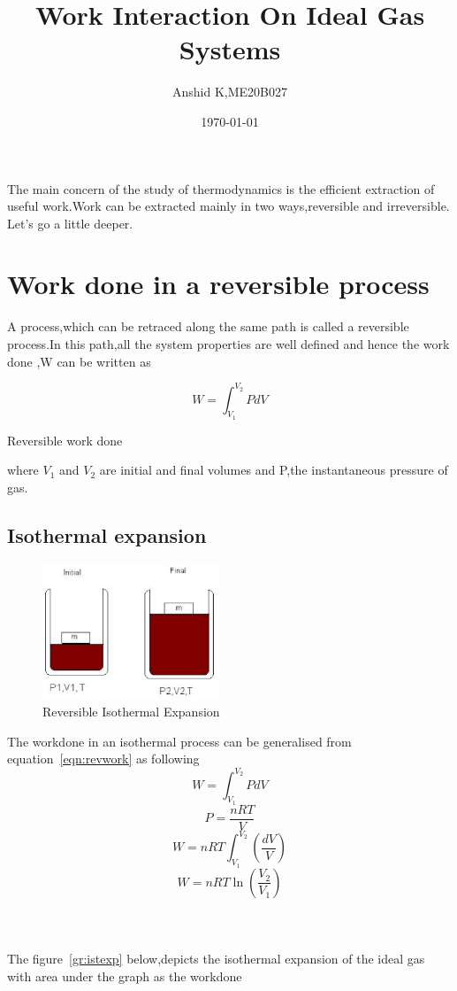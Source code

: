 \documentclass[a4paper,12pt]{article}
\begin{document}
\title{Work Interaction On Ideal Gas Systems}
\author{Anshid K,ME20B027}
\date{\today}
\maketitle

The main concern of the study of thermodynamics is the efficient extraction of useful work.Work can be extracted mainly in two ways,reversible and irreversible.
Let's go a little deeper.
 
\section{Work done in a reversible process}

A process,which can be retraced along the same path is called a reversible process.In this path,all the system properties are well defined and hence the work done ,W can be written as

\begin{equation}
	W=\int_{V_1}^{V_2}{PdV}
	\label{eqn:revwork}
\end{equation}
\begin{center}
Reversible work done ~\cite{fleming_me027}
\end{center}
where $V_1$ and $V_2$ are initial and final volumes and P,the instantaneous pressure of gas.

\subsection{Isothermal expansion}
\begin{figure}[h]
	\begin{center}
		\includegraphics[width=200px]{me20b027a.eps}
	\end{center}
	\caption{Reversible Isothermal Expansion~\cite{libtex_me027}}
	\label{fig:revexp}
\end{figure}
The workdone in an isothermal process can be generalised from equation~\ref{eqn:revwork} as following
$$W=\int_{V_1}^{V_2}{PdV}$$
$$P=\frac{nRT}{V}$$
$$W=nRT\int_{V_1}^{V_2}{\left(\frac{dV}{V}\right)}$$
\begin{equation}
	W=nRT\ln\left(\frac{V_2}{V_1}\right)
\end{equation}
\\\\\\
The figure~\ref{gr:istexp} below,depicts the isothermal expansion of the ideal gas with area under the graph as the workdone
\end{document}
